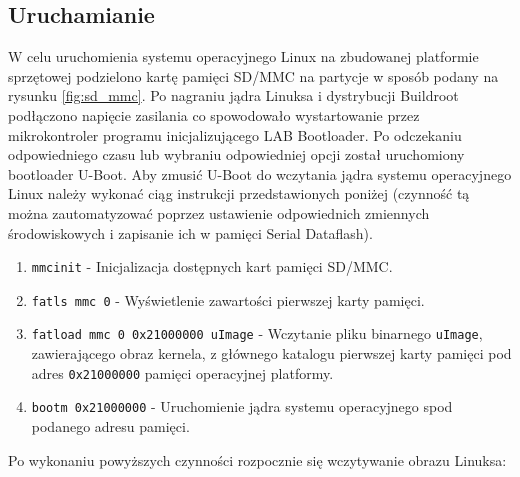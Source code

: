 \documentclass[a4paper,12pt]{book}
\begin{document}
			\subsection{Uruchamianie}
				W celu uruchomienia systemu operacyjnego Linux na zbudowanej platformie sprzętowej podzielono kartę pamięci SD/MMC na partycje w sposób podany na rysunku \ref{fig:sd_mmc}. Po nagraniu jądra Linuksa i dystrybucji Buildroot podłączono napięcie zasilania co spowodowało wystartowanie przez mikrokontroler programu inicjalizującego LAB Bootloader. Po odczekaniu odpowiedniego czasu lub wybraniu odpowiedniej opcji został uruchomiony bootloader U-Boot. Aby zmusić U-Boot do wczytania jądra systemu operacyjnego Linux należy wykonać ciąg instrukcji przedstawionych poniżej (czynność tą można zautomatyzować poprzez ustawienie odpowiednich zmiennych środowiskowych i zapisanie ich w pamięci Serial Dataflash).
				\begin{enumerate}
					\item \texttt{mmcinit} - Inicjalizacja dostępnych kart pamięci SD/MMC.
					\item \texttt{fatls mmc 0} - Wyświetlenie zawartości pierwszej karty pamięci.
					\item \texttt{fatload mmc 0 0x21000000 uImage} - Wczytanie pliku binarnego \texttt{uImage}, zawierającego obraz kernela, z głównego katalogu pierwszej karty pamięci pod adres \texttt{0x21000000} pamięci operacyjnej platformy.
					\item \texttt{bootm 0x21000000} - Uruchomienie jądra systemu operacyjnego spod podanego adresu pamięci.
				\end{enumerate}
				Po wykonaniu powyższych czynności rozpocznie się wczytywanie obrazu Linuksa:
\end{document}
